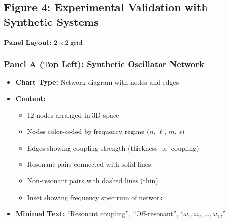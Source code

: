 
\subsection*{Figure 4: Experimental Validation with Synthetic Systems}

\textbf{Panel Layout:} $2 \times 2$ grid

\subsubsection*{Panel A (Top Left): Synthetic Oscillator Network}
\begin{itemize}
\item \textbf{Chart Type:} Network diagram with nodes and edges
\item \textbf{Content:}
  \begin{itemize}
  \item 12 nodes arranged in 3D space
  \item Nodes color-coded by frequency regime ($n$, $\ell$, $m$, $s$)
  \item Edges showing coupling strength (thickness $\propto$ coupling)
  \item Resonant pairs connected with solid lines
  \item Non-resonant pairs with dashed lines (thin)
  \item Inset showing frequency spectrum of network
  \end{itemize}
\item \textbf{Minimal Text:} ``Resonant coupling'', ``Off-resonant'', ``$\omega_1, \omega_2, \ldots, \omega_{12}$''
\end{itemize}

